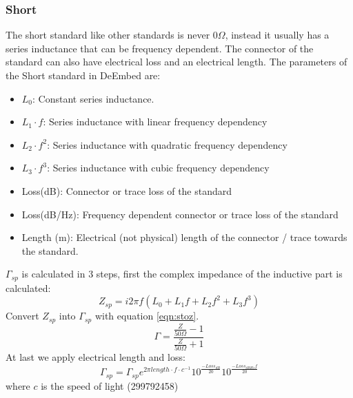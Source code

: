 \subsubsection{Short}
\label{sec:shortstd}
The short standard like other standards is never $0\Omega$, instead it usually has a series inductance that can be frequency dependent. The connector of the standard can also have electrical loss and an electrical length. The parameters of the Short standard in DeEmbed are:
\begin{itemize}
	\item $L_0$: Constant series inductance.
	\item $L_1 \cdot f$: Series inductance with linear frequency dependency
	\item $L_2 \cdot f^2$: Series inductance with quadratic frequency dependency
	\item $L_3 \cdot f^3$: Series inductance with cubic frequency dependency
	\item Loss(dB): Connector or trace loss of the standard
	\item Loss(dB/Hz): Frequency dependent connector or trace loss of the standard
	\item Length (m): Electrical (not physical) length of the connector / trace towards the standard.
\end{itemize}
$\Gamma_{sp}$ is calculated in 3 steps, first the complex impedance of the inductive part is calculated:
\begin{equation}
Z_{sp} = i 2 \pi f (L_0 + L_1 f + L_2 f^2 + L_3 f^3)
\end{equation}
Convert $Z_{sp}$ into $\Gamma_{sp}$ with equation \ref{eqn:stoz}.
\begin{equation}
\label{eqn:stoz}
\Gamma=\frac{\frac{Z}{50\Omega}-1}{\frac{Z}{50\Omega}+1}
\end{equation}
At last we apply electrical length and loss:
\begin{equation}
\Gamma_{sp} = \Gamma_{sp} e^{2 \pi length\cdot f\cdot c^{-1}} 10^{\frac{-Loss_{dB}}{20}} 10^{\frac{-Loss_{dBHz} f }{20}}
\end{equation}
where $c$ is the speed of light (299792458)


